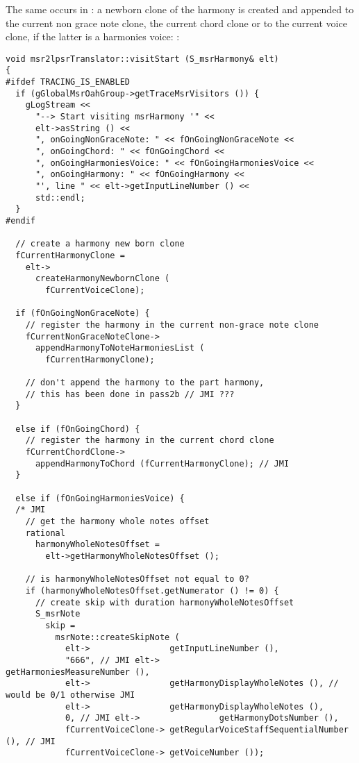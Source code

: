 The same occurs in : a newborn clone of the harmony is created and appended to the current non grace note clone, the current chord clone or to the current voice clone, if the latter is a harmonies voice: %
:
\begin{lstlisting}[language=CPlusPlus]
void msr2lpsrTranslator::visitStart (S_msrHarmony& elt)
{
#ifdef TRACING_IS_ENABLED
  if (gGlobalMsrOahGroup->getTraceMsrVisitors ()) {
    gLogStream <<
      "--> Start visiting msrHarmony '" <<
      elt->asString () <<
      ", onGoingNonGraceNote: " << fOnGoingNonGraceNote <<
      ", onGoingChord: " << fOnGoingChord <<
      ", onGoingHarmoniesVoice: " << fOnGoingHarmoniesVoice <<
      ", onGoingHarmony: " << fOnGoingHarmony <<
      "', line " << elt->getInputLineNumber () <<
      std::endl;
  }
#endif

  // create a harmony new born clone
  fCurrentHarmonyClone =
    elt->
      createHarmonyNewbornClone (
        fCurrentVoiceClone);

  if (fOnGoingNonGraceNote) {
    // register the harmony in the current non-grace note clone
    fCurrentNonGraceNoteClone->
      appendHarmonyToNoteHarmoniesList (
        fCurrentHarmonyClone);

    // don't append the harmony to the part harmony,
    // this has been done in pass2b // JMI ???
  }

  else if (fOnGoingChord) {
    // register the harmony in the current chord clone
    fCurrentChordClone->
      appendHarmonyToChord (fCurrentHarmonyClone); // JMI
  }

  else if (fOnGoingHarmoniesVoice) {
  /* JMI
    // get the harmony whole notes offset
    rational
      harmonyWholeNotesOffset =
        elt->getHarmonyWholeNotesOffset ();

    // is harmonyWholeNotesOffset not equal to 0?
    if (harmonyWholeNotesOffset.getNumerator () != 0) {
      // create skip with duration harmonyWholeNotesOffset
      S_msrNote
        skip =
          msrNote::createSkipNote (
            elt->                getInputLineNumber (),
            "666", // JMI elt->                getHarmoniesMeasureNumber (),
            elt->                getHarmonyDisplayWholeNotes (), // would be 0/1 otherwise JMI
            elt->                getHarmonyDisplayWholeNotes (),
            0, // JMI elt->                getHarmonyDotsNumber (),
            fCurrentVoiceClone-> getRegularVoiceStaffSequentialNumber (), // JMI
            fCurrentVoiceClone-> getVoiceNumber ());


\end{lstlisting}
